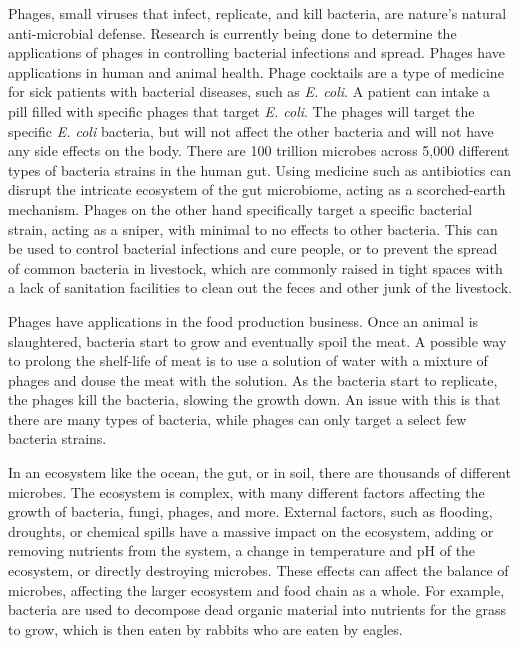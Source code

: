 Phages, small viruses that infect, replicate, and kill bacteria, are nature's natural anti-microbial defense. Research is currently being done to determine the applications of phages in controlling bacterial infections and spread. Phages have applications in human and animal health. Phage cocktails are a type of medicine for sick patients with bacterial diseases, such as \textit{E. coli}. A patient can intake a pill filled with specific phages that target \textit{E. coli}. The phages will target the specific \textit{E. coli} bacteria, but will not affect the other bacteria and will not have any side effects on the body. There are 100 trillion microbes across 5,000 different types of bacteria strains in the human gut. Using medicine such as antibiotics can disrupt the intricate ecosystem of the gut microbiome, acting as a scorched-earth mechanism. Phages on the other hand specifically target a specific bacterial strain, acting as a sniper, with minimal to no effects to other bacteria. This can be used to control bacterial infections and cure people, or to prevent the spread of common bacteria in livestock, which are commonly raised in tight spaces with a lack of sanitation facilities to clean out the feces and other junk of the livestock. 

Phages have applications in the food production business. Once an animal is slaughtered, bacteria start to grow and eventually spoil the meat. A possible way to prolong the shelf-life of meat is to use a solution of water with a mixture of phages and douse the meat with the solution. As the bacteria start to replicate, the phages kill the bacteria, slowing the growth down. An issue with this is that there are many types of bacteria, while phages can only target a select few bacteria strains. 

In an ecosystem like the ocean, the gut, or in soil, there are thousands of different microbes. The ecosystem is complex, with many different factors affecting the growth of bacteria, fungi,  phages, and more. External factors, such as flooding, droughts, or chemical spills have a massive impact on the ecosystem, adding or removing nutrients from the system, a change in temperature and pH of the ecosystem, or directly destroying microbes. These effects can affect the balance of microbes, affecting the larger ecosystem and food chain as a whole. For example, bacteria are used to decompose dead organic material into nutrients for the grass to grow, which is then eaten by rabbits who are eaten by eagles. 

